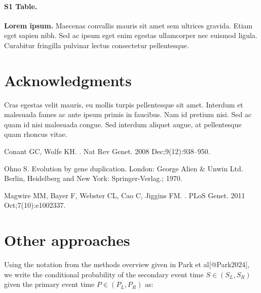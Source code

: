 \documentclass[10pt,letterpaper]{article}
\begin{document}
\paragraph*{S1 Table.}
\label{S1_Table}
{\bf Lorem ipsum.} Maecenas convallis mauris sit amet sem ultrices gravida. Etiam eget sapien nibh. Sed ac ipsum eget enim egestas ullamcorper nec euismod ligula. Curabitur fringilla pulvinar lectus consectetur pellentesque.

\section*{Acknowledgments}
Cras egestas velit mauris, eu mollis turpis pellentesque sit amet. Interdum et malesuada fames ac ante ipsum primis in faucibus. Nam id pretium nisi. Sed ac quam id nisi malesuada congue. Sed interdum aliquet augue, at pellentesque quam rhoncus vitae.

\nolinenumbers

%
%
% 
\begin{thebibliography}{10}

Conant GC, Wolfe KH.
.
\newblock Nat Rev Genet. 2008 Dec;9(12):938--950.

Ohno S.
\newblock Evolution by gene duplication.
\newblock London: George Alien \& Unwin Ltd. Berlin, Heidelberg and New York:
  Springer-Verlag.; 1970.

Magwire MM, Bayer F, Webster CL, Cao C, Jiggins FM.
.
\newblock PLoS Genet. 2011 Oct;7(10):e1002337.

\end{thebibliography}

\appendix \section{Other approaches} 


Using the notation from the methods overview given in Park et al[@Park2024], we write the conditional probability of the secondary event time $S\in (S_L,S_R)$ given the primary event time $P \in (P_L,P_R)$ as:
\end{document}
